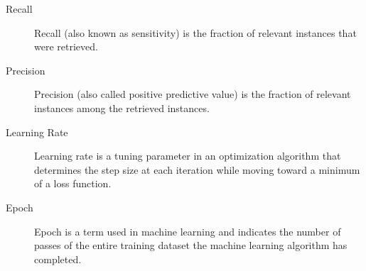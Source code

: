 \begin{description}
      \item[Recall]{
              Recall (also known as sensitivity) is the fraction of relevant instances that were retrieved.}

      \item[Precision]{
              Precision (also called positive predictive value) is the fraction of relevant instances among 
              the retrieved instances.}
      
      \item[Learning Rate]{
              Learning rate is a tuning parameter in an optimization algorithm that determines the step size
              at each iteration while moving toward a minimum of a loss function.}
            
          \item[Epoch]{
              Epoch is a term used in machine learning and indicates the number of passes of the entire
          training dataset the machine learning algorithm has completed.}
   \end{description}


